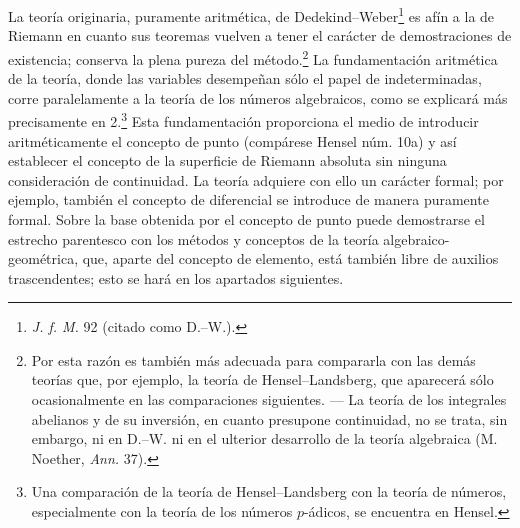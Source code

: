 \documentclass[11pt]{article}
\begin{document}
La teoría originaria, puramente aritmética, de Dedekind--Weber\footnote{\emph{J. f. M.} 92 (citado como D.--W.).} es afín a la de Riemann en cuanto sus teoremas vuelven a tener el carácter de demostraciones de existencia; conserva la plena pureza del método.\footnote{Por esta razón es también más adecuada para compararla con las demás teorías que, por ejemplo, la teoría de Hensel--Landsberg, que aparecerá sólo ocasionalmente en las comparaciones siguientes. --- La teoría de los integrales abelianos y de su inversión, en cuanto presupone continuidad, no se trata, sin embargo, ni en D.--W. ni en el ulterior desarrollo de la teoría algebraica (M. Noether, \emph{Ann.} 37).} La fundamentación aritmética de la teoría, donde las variables desempeñan sólo el papel de indeterminadas, corre paralelamente a la teoría de los números algebraicos, como se explicará más precisamente en 2.\footnote{Una comparación de la teoría de Hensel--Landsberg con la teoría de números, especialmente con la teoría de los números \(p\)-ádicos, se encuentra en Hensel.} Esta fundamentación proporciona el medio de introducir aritméticamente el concepto de punto (compárese Hensel núm. 10a) y así establecer el concepto de la superficie de Riemann absoluta sin ninguna consideración de continuidad. La teoría adquiere con ello un carácter formal; por ejemplo, también el concepto de diferencial se introduce de manera puramente formal. Sobre la base obtenida por el concepto de punto puede demostrarse el estrecho parentesco con los métodos y conceptos de la teoría algebraico-geométrica, que, aparte del concepto de elemento, está también libre de auxilios trascendentes; esto se hará en los apartados siguientes.
\end{document}
